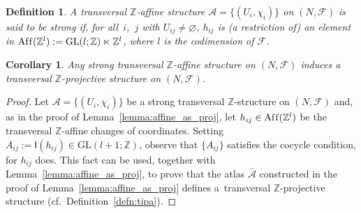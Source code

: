 \documentclass[pdftex]{sigma}
\numberwithin{equation}{section}
\newtheorem{Corollary}[Theorem]{Corollary}
\newtheorem{Definition}[Theorem]{Definition}
\newcommand{\ZZ}{\mathbb{Z}}
\begin{document}
\begin{Definition}\label{defn:strong_Z_aff}
A transversal $\ZZ$-af\/f\/ine structure $\mathcal{A}=\{(U_i,\chi_i)\}$ on $(N,\mathcal{F})$ is said to be {\it strong} if, for all~$i$,~$j$ with $U_{ij} \neq \varnothing$, $h_{ij}$ is (a restriction of) an element in $\operatorname{Af\/f}(\ZZ^l):= \mathrm{GL}(l;\ZZ) \ltimes \ZZ^l$, where $l$ is the codimension of $\mathcal{F}$.
\end{Definition}

\begin{Corollary}\label{cor:strong_Z_proj}
Any strong transversal $\ZZ$-affine structure on $(N,\mathcal{F})$ induces a transversal $\ZZ$-projective structure on $(N,\mathcal{F})$.
\end{Corollary}
\begin{proof}
Let $\mathcal{A}=\{(U_i,\chi_i)\}$ be a strong transversal $\ZZ$-structure on $(N,\mathcal{F})$ and, as in the proof of Lemma~\ref{lemma:affine_as_proj}, let $h_{ij} \in \operatorname{Af\/f}(\ZZ^l)$ be the transversal $\ZZ$-af\/f\/ine changes of coordinates. Setting $A_{ij}:= \mathsf{I}(h_{ij}) \in \mathrm{GL}(l+1;\ZZ)$, observe that $\{A_{ij}\}$ satisf\/ies the cocycle condition, for $h_{ij}$ does. This fact can be used, together with Lemma~\ref{lemma:affine_as_proj}, to prove that the atlas $\bar{\mathcal{A}}$ constructed in the proof of Lemma~\ref{lemma:affine_as_proj} def\/ines a~transversal $\ZZ$-projective structure (cf.\ Def\/inition~\ref{defn:tipa}).
\end{proof}
\end{document}
